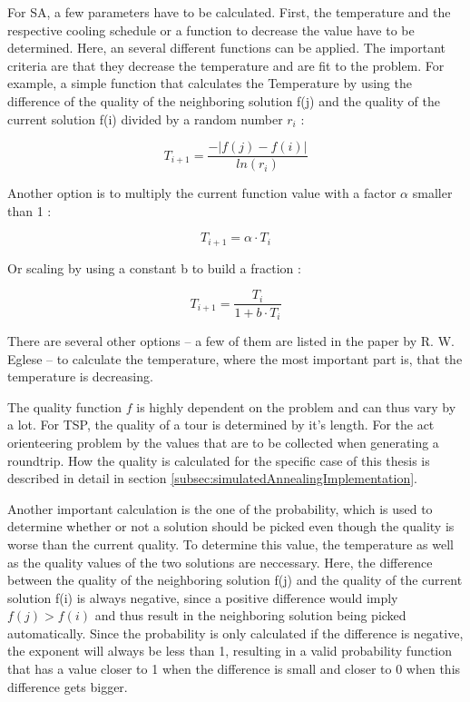 For SA, a few parameters have to be calculated.
First, the temperature and the respective cooling schedule or a function to decrease the value have to be determined.
Here, an several different functions can be applied. 
The important criteria are that they decrease the temperature and are fit to the problem.
For example, a simple function that calculates the Temperature by using the difference of the quality of the neighboring solution f(j) and the quality of the current solution f(i) divided by a random number $r_i$ \cite{zhan_list-based_2016}: 

\begin{equation}\label{eq:temperatureSchedule}
	T_{i+1} = \frac{- |f(j)-f(i)|}{ln(r_i)}	
\end{equation}

Another option is to multiply the current function value with a factor $\alpha$ smaller than 1 \cite{eglese_simulated_1990}:

\begin{equation}\label{eq:temperatureSchedule2}
	T_{i+1} = \alpha \cdot T_i
\end{equation}

Or scaling by using a constant b to build a fraction \cite{eglese_simulated_1990}: 

\begin{equation}\label{eq:temperatureSchedule3}
	T_{i+1} = \frac{T_i}{1 + b \cdot T_i}	
\end{equation}

There are several other options -- a few of them are listed in the paper by R. W. Eglese \cite{eglese_simulated_1990} -- to calculate the temperature, where the most important part is, that the temperature is decreasing.

The quality function $f$ is highly dependent on the problem and can thus vary by a lot. 
For TSP, the quality of a tour is determined by it's length.
For the act orienteering problem by the values that are to be collected when generating a roundtrip. 
How the quality is calculated for the specific case of this thesis is described in detail in section \ref{subsec:simulatedAnnealingImplementation}.

Another important calculation is the one of the probability, which is used to determine whether or not a solution should be picked even though the quality is worse than the current quality.
To determine this value, the temperature as well as the quality values of the two solutions are neccessary.
Here, the difference between the quality of the neighboring solution f(j) and the quality of the current solution f(i) is always negative, since a positive difference would imply $f(j) > f(i)$ and thus result in the neighboring solution being picked automatically.
Since the probability is only calculated if the difference is negative, the exponent will always be less than 1, resulting in a valid probability function that has a value closer to 1 when the difference is small and closer to 0 when this difference gets bigger.


